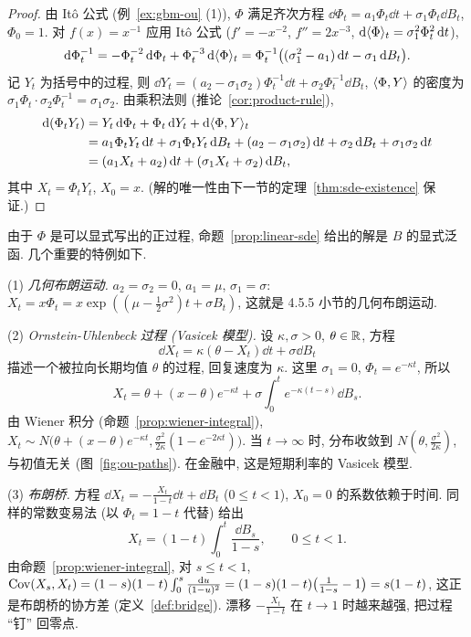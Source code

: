 \begin{proof}
由 It\^o 公式 (例~\ref{ex:gbm-ou} (1)), $\Phi$ 满足齐次方程 $\dd\Phi_t=a_1\Phi_t\dd t+\sigma_1\Phi_t\dd B_t$, $\Phi_0=1$. 对 $f(x)=x^{-1}$ 应用 It\^o 公式 ($f'=-x^{-2}$, $f''=2x^{-3}$, $\mathop{}\!\mathrm{d}\langle\Phi\rangle_t=\sigma_1^2\Phi_t^2\mathop{}\!\mathrm{d} t$),
\[
\mathop{}\!\mathrm{d}\Phi_t^{-1}=-\Phi_t^{-2}\mathop{}\!\mathrm{d}\Phi_t+\Phi_t^{-3}\mathop{}\!\mathrm{d}\langle\Phi\rangle_t=\Phi_t^{-1}\big((\sigma_1^2-a_1)\mathop{}\!\mathrm{d} t-\sigma_1\mathop{}\!\mathrm{d} B_t\big).
\]
记 $Y_t$ 为括号中的过程, 则 $\dd Y_t=(a_2-\sigma_1\sigma_2)\Phi_t^{-1}\dd t+\sigma_2\Phi_t^{-1}\dd B_t$, $\langle\Phi,Y\rangle$ 的密度为 $\sigma_1\Phi_t\cdot\sigma_2\Phi_t^{-1}=\sigma_1\sigma_2$. 由乘积法则 (推论~\ref{cor:product-rule}),
\begin{align*}
\dd(\Phi_tY_t)&=Y_t\dd\Phi_t+\Phi_t\dd Y_t+\dd\ip{\Phi,Y}_t\\
&=a_1\Phi_tY_t\dd t+\sigma_1\Phi_tY_t\dd B_t+(a_2-\sigma_1\sigma_2)\dd t+\sigma_2\dd B_t+\sigma_1\sigma_2\dd t\\
&=(a_1X_t+a_2)\dd t+(\sigma_1X_t+\sigma_2)\dd B_t,
\end{align*}
其中 $X_t=\Phi_tY_t$, $X_0=x$. (解的唯一性由下一节的定理~\ref{thm:sde-existence} 保证.)
\end{proof}

由于 $\Phi$ 是可以显式写出的正过程, 命题~\ref{prop:linear-sde} 给出的解是 $B$ 的显式泛函. 几个重要的特例如下.

\begin{example}[可解方程]\label{ex:linear-examples}
(1) \emph{几何布朗运动.} $a_2=\sigma_2=0$, $a_1=\mu$, $\sigma_1=\sigma$: $X_t=x\Phi_t=x\exp((\mu-\frac{1}{2}\sigma^2)t+\sigma B_t)$, 这就是 4.5.5 小节的几何布朗运动.

(2) \emph{Ornstein-Uhlenbeck 过程 (Vasicek 模型).} 设 $\kappa,\sigma>0$, $\theta\in\mathbb{R}$, 方程
\[
\dd X_t=\kappa(\theta-X_t)\dd t+\sigma\dd B_t
\]
描述一个被拉向长期均值 $\theta$ 的过程, 回复速度为 $\kappa$. 这里 $\sigma_1=0$, $\Phi_t=e^{-\kappa t}$, 所以
\[
X_t=\theta+(x-\theta)e^{-\kappa t}+\sigma\int_0^te^{-\kappa(t-s)}\dd B_s.
\]
由 Wiener 积分 (命题~\ref{prop:wiener-integral}), $X_t\sim N\big(\theta+(x-\theta)e^{-\kappa t},\frac{\sigma^2}{2\kappa}(1-e^{-2\kappa t})\big)$. 当 $t\to\infty$ 时, 分布收敛到 $N(\theta,\frac{\sigma^2}{2\kappa})$, 与初值无关 (图~\ref{fig:ou-paths}). 在金融中, 这是短期利率的 Vasicek 模型.

(3) \emph{布朗桥.} 方程 $\dd X_t=-\frac{X_t}{1-t}\dd t+\dd B_t$ ($0\le t<1$), $X_0=0$ 的系数依赖于时间. 同样的常数变易法 (以 $\Phi_t=1-t$ 代替) 给出
\[
X_t=(1-t)\int_0^t\frac{\dd B_s}{1-s},\qquad0\le t<1.
\]
由命题~\ref{prop:wiener-integral}, 对 $s\le t<1$, $\operatorname{Cov}(X_s,X_t)=(1-s)(1-t)\int_0^s\frac{\mathop{}\!\mathrm{d} u}{(1-u)^2}=(1-s)(1-t)\big(\frac{1}{1-s}-1\big)=s(1-t)$, 这正是布朗桥的协方差 (定义~\ref{def:bridge}). 漂移 $-\frac{X_t}{1-t}$ 在 $t\to1$ 时越来越强, 把过程 ``钉'' 回零点.
\end{example}

